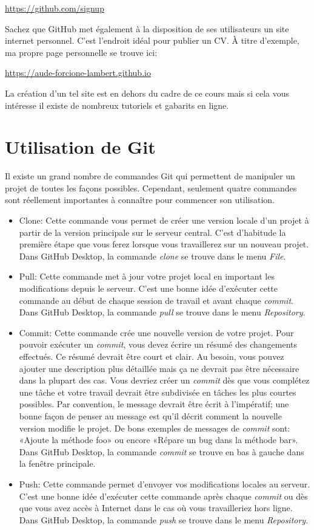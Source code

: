 \documentclass{article}
\begin{document}
\noindent \href{https://github.com/signup}{https://github.com/signup}

Sachez que GitHub met également à la disposition de ses utilisateurs un site internet personnel. C'est l'endroit idéal pour publier un CV. À titre d'exemple, ma propre page personnelle se trouve ici:

\noindent \href{https://aude-forcione-lambert.github.io}{https://aude-forcione-lambert.github.io}

La création d'un tel site est en dehors du cadre de ce cours mais si cela vous intéresse il existe de nombreux tutoriels et gabarits en ligne.

\section{Utilisation de Git}

Il existe un grand nombre de commandes Git qui permettent de manipuler un projet de toutes les façons possibles. Cependant, seulement quatre commandes sont réellement importantes à connaître pour commencer son utilisation.

\begin{itemize}
\item Clone: Cette commande vous permet de créer une version locale d'un projet à partir de la version principale sur le serveur central. C'est d'habitude la première étape que vous ferez lorsque vous travaillerez sur un nouveau projet. Dans GitHub Desktop, la commande \emph{clone} se trouve dans le menu \emph{File}.
\item Pull: Cette commande met à jour votre projet local en important les modifications depuis le serveur. C'est une bonne idée d'exécuter cette commande au début de chaque session de travail et avant chaque \emph{commit}. Dans GitHub Desktop, la commande \emph{pull} se trouve dans le menu \emph{Repository}.
\item Commit: Cette commande crée une nouvelle version de votre projet. Pour pouvoir exécuter un \emph{commit}, vous devez écrire un résumé des changements effectués. Ce résumé devrait être court et clair. Au besoin, vous pouvez ajouter une description plus détaillée mais ça ne devrait pas être nécessaire dans la plupart des cas. Vous devriez créer un \emph{commit} dès que vous complétez une tâche et votre travail devrait être subdivisée en tâches les plus courtes possibles. Par convention, le message devrait être écrit à l'impératif; une bonne façon de penser au message est qu'il décrit comment la nouvelle version modifie le projet. De bons exemples de messages de \emph{commit} sont: «Ajoute la méthode foo» ou encore «Répare un bug dans la méthode bar». Dans GitHub Desktop, la commande \emph{commit} se trouve en bas à gauche dans la fenêtre principale.
\item Push: Cette commande permet d'envoyer vos modifications locales au serveur. C'est une bonne idée d'exécuter cette commande après chaque \emph{commit} ou dès que vous avez accès à Internet dans le cas où vous travailleriez hors ligne. Dans GitHub Desktop, la commande \emph{push} se trouve dans le menu \emph{Repository}.
\end{itemize}
\end{document}
